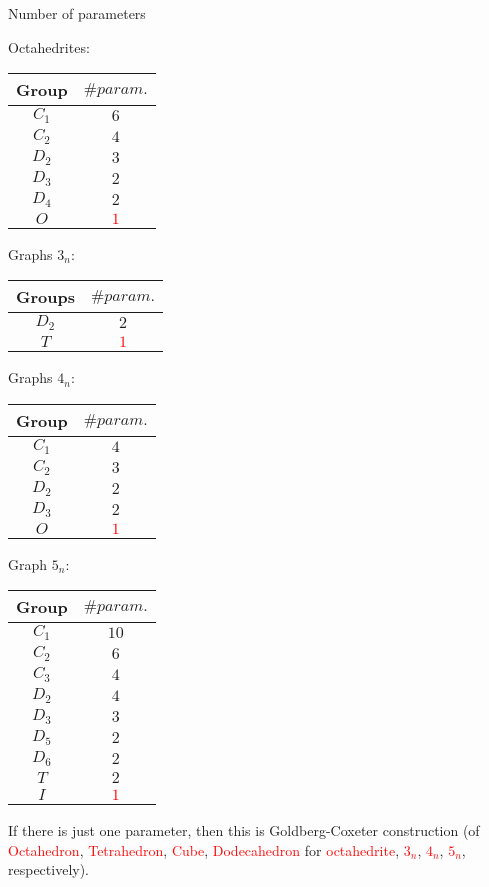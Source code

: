 \documentclass[%
pdf,
colorBG,
slideColor,
]{prosper}
\begin{document}
\begin{slide}{Number of parameters}
{\tiny
\begin{minipage}{3.7cm}
\centering
Octahedrites:\par
\begin{tabular}{||c|c||}
\hline
\hline
Group  & $\# param.$\\
\hline
\hline
$C_1$  & $6$\\
$C_2$  & $4$\\
$D_2$  & $3$\\
$D_3$  & $2$\\
$D_4$  & $2$\\
$O$    & \textcolor{red}{$1$}\\
\hline
\hline
\end{tabular}
\end{minipage}
\begin{minipage}{3.7cm}
\centering
Graphs $3_n$:\par
\begin{tabular}{||c|c||}
\hline
\hline
Groups  & $\# param.$\\
\hline
\hline
$D_2$  & $2$\\
$T$    & \textcolor{red}{$1$}\\
\hline
\hline
\end{tabular}

Graphs $4_n$:\par
\begin{tabular}{||c|c||}
\hline
\hline
Group  & $\# param.$\\
\hline
\hline
$C_1$  & $4$\\
$C_2$  & $3$\\
$D_2$  & $2$\\
$D_3$  & $2$\\
$O$    & \textcolor{red}{$1$}\\
\hline
\hline
\end{tabular}
\end{minipage}
\begin{minipage}{3.7cm}
\centering
Graph $5_n$:\par
\begin{tabular}{||c|c||}
\hline
\hline
Group  & $\# param.$\\
\hline
\hline
$C_1$  &$10$\\
$C_2$  &$6$\\
$C_3$  &$4$\\
$D_2$  &$4$\\
$D_3$  &$3$\\
$D_5$  &$2$\\
$D_6$  &$2$\\
$T$    &$2$\\
$I$    &\textcolor{red}{$1$}\\
\hline
\hline
\end{tabular}
\end{minipage}
}

If there is just one parameter, then this is Goldberg-Coxeter construction (of \textcolor{red}{Octahedron}, \textcolor{red}{Tetrahedron}, \textcolor{red}{Cube}, \textcolor{red}{Dodecahedron} for \textcolor{red}{octahedrite}, \textcolor{red}{$3_n$}, \textcolor{red}{$4_n$}, \textcolor{red}{$5_n$}, respectively).

\end{slide}
\end{document}

